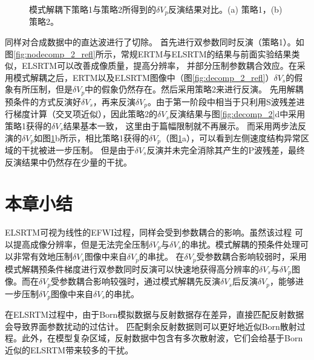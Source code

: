 \begin{figure}[!htb]
   \centering
   \caption{
   模式解耦下策略1与策略2所得到的$\delta
   V_p$反演结果对比。(a) 策略1，(b) 策略2。}
   \label{fig:final_comparison_2}
\end{figure}
同样对合成数据中的直达波进行了切除。
首先进行双参数同时反演（策略1）。如图\ref{fig:nodecomp_2_refl}所示，常规ERTM与ELSRTM的结果与前面实验结果类似，ELSRTM可以改善成像质量，提高分辨率，
并部分压制参数耦合效应。在采用模式解耦之后，ERTM以及ELSRTM图像中（图\ref{fig:decomp_2_refl}）$\delta
V_s$的假象有所压制，但是$\delta
V_p$中的假象仍然存在。然后采用策略2来进行反演。
先用解耦预条件的方式反演好$\delta V_s$，再来反演$\delta
V_p$。由于第一阶段中相当于只利用S波残差进行梯度计算（交叉项近似），因此策略2的$\delta
V_s$反演结果与图\ref{fig:decomp_2}d中采用策略1获得的$\delta V_s$结果基本一致，
这里由于篇幅限制就不再展示。
而采用两步法反演的$\delta
V_p$如图\ref{fig:final_comparison_2}b所示，相比策略1获得的$\delta
V_p$（图\ref{fig:final_comparison_2}a），可以看到左侧速度结构异常区域的干扰被进一步压制。
但是由于$\delta V_s$反演并未完全消除其产生的P波残差，最终反演结果中仍然存在少量的干扰。
\section{本章小结}
ELSRTM可视为线性的EFWI过程，同样会受到参数耦合的影响。虽然该过程
可以提高成像分辨率，但是无法完全压制$\delta V_p$与$\delta V_s$的串扰。模式解耦的预条件处理可以非常有效地压制$\delta
V_s$图像中来自$\delta V_p$的串扰。
在$\delta V_p$受参数耦合影响较弱时，采用模式解耦预条件梯度进行双参数同时反演可以快速地获得高分辨率的$\delta
V_s$与$\delta V_p$图像。而在$\delta V_p$受参数耦合影响较强时，通过模式解耦先反演$\delta V_s$后反演$\delta
V_p$，能够进一步压制$\delta V_p$图像中来自$\delta V_s$的串扰。

在ELSRTM过程中，由于Born模拟数据与反射数据存在差异，直接匹配反射数据会导致界面参数扰动的过估计。
匹配剩余反射数据则可以更好地近似Born散射过程。此外，在模型复杂区域，反射数据中包含有多次散射波，它们会给基于Born近似的ELSRTM带来较多的干扰。

